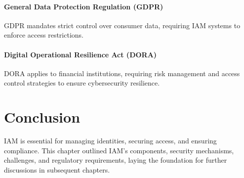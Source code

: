 \paragraph{General Data Protection Regulation (GDPR)}
GDPR mandates strict control over consumer data, requiring IAM systems to enforce access restrictions\citep{IAM-gdpr:}.

\paragraph{Digital Operational Resilience Act (DORA)}
DORA applies to financial institutions, requiring risk management and access control strategies to ensure cybersecurity resilience\citep{DoraIAM:}.

\section{Conclusion}
IAM is essential for managing identities, securing access, and ensuring compliance. This chapter outlined IAM's components, security mechanisms, challenges, and regulatory requirements, laying the foundation for further discussions in subsequent chapters.
